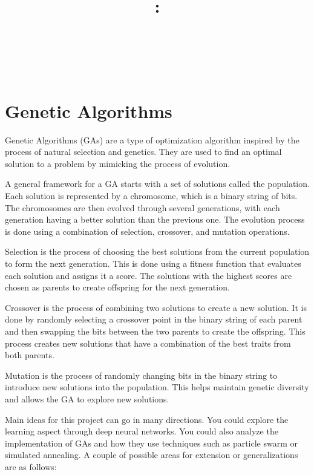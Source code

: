 \documentclass{article}
\title{
    \vspace{2in}
    \textbf{\hmwkClass:\\ \hmwkTitle} \\
    \vspace{0.1in}\large{\textit{\hmwkClassInstructor\ \hmwkSection}} \\
    \vspace{3in}
    \author{\textbf{\hmwkAuthorName}}
    \date{}
}
\begin{document}
\maketitle
\pagebreak

\section{Genetic Algorithms}

    Genetic Algorithms (GAs) are a type of optimization algorithm inspired by the process of natural selection and genetics. They are used to find an optimal solution to a problem by mimicking the process of evolution.
    
    \vspace{3mm}
    A general framework for a GA starts with a set of solutions called the population. Each solution is represented by a chromosome, which is a binary string of bits. The chromosomes are then evolved through several generations, with each generation having a better solution than the previous one. The evolution process is done using a combination of selection, crossover, and mutation operations.
    
    \vspace{3mm}
    Selection is the process of choosing the best solutions from the current population to form the next generation. This is done using a fitness function that evaluates each solution and assigns it a score. The solutions with the highest scores are chosen as parents to create offspring for the next generation.
    
    \vspace{3mm}
    Crossover is the process of combining two solutions to create a new solution. It is done by randomly selecting a crossover point in the binary string of each parent and then swapping the bits between the two parents to create the offspring. This process creates new solutions that have a combination of the best traits from both parents.
    
    \vspace{3mm}
    Mutation is the process of randomly changing bits in the binary string to introduce new solutions into the population. This helps maintain genetic diversity and allows the GA to explore new solutions.
    
    \vspace{3mm}
    Main ideas for this project can go in many directions. You could explore the learning aspect through deep neural networks. You could also analyze the implementation of GAs and how they use techniques such as particle swarm or simulated annealing. A couple of possible areas for extension or generalizations are as follows:
    
\end{document}
